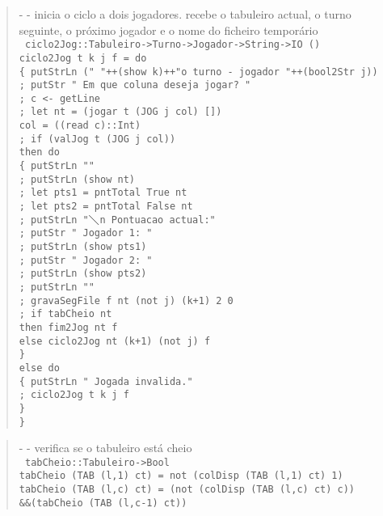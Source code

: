 \documentclass[a4paper,titlepage]{scrreprt}
\begin{document}
	\begin{quote}
		{\small - - inicia o ciclo a dois jogadores. recebe o tabuleiro actual, o turno seguinte, o próximo jogador e o nome do ficheiro temporário\\}
		{\tt
		ciclo2Jog::Tabuleiro->Turno->Jogador->String->IO ()\\
		ciclo2Jog t k j f = do\\
		\{ putStrLn (" "++(show k)++"o turno - jogador "++(bool2Str j))\\
		; putStr " Em que coluna deseja jogar? "\\
		; c <- getLine\\
		; let nt = (jogar t (JOG j col) [])\\
		  col = ((read c)::Int)\\
		; if (valJog t (JOG j col))\\
		then do\\
		\{ putStrLn ""\\
		; putStrLn (show nt)\\
		; let pts1 = pntTotal True nt\\
		; let pts2 = pntTotal False nt\\
		; putStrLn "$\diagdown$n Pontuacao actual:"\\
		; putStr " Jogador 1: "\\
		; putStrLn (show pts1)\\
		; putStr " Jogador 2: "\\
		; putStrLn (show pts2)\\
		; putStrLn ""\\
		; gravaSegFile f nt (not j) (k+1) 2 0\\
		; if tabCheio nt\\
		then fim2Jog nt f\\
		else ciclo2Jog nt (k+1) (not j) f\\
		\}\\
		else do\\
		\{ putStrLn " Jogada invalida."\\
		; ciclo2Jog t k j f\\
		\}\\
		\}
		}
	\end{quote}
	\begin{quote}
		{\small - - verifica se o tabuleiro está cheio\\}
		{\tt
		tabCheio::Tabuleiro->Bool\\
		tabCheio (TAB (l,1) ct) = not (colDisp (TAB (l,1) ct) 1)\\
		tabCheio (TAB (l,c) ct) = (not (colDisp (TAB (l,c) ct) c))\\
		\&\&(tabCheio (TAB (l,c-1) ct))
		}
	\end{quote}
\end{document}
